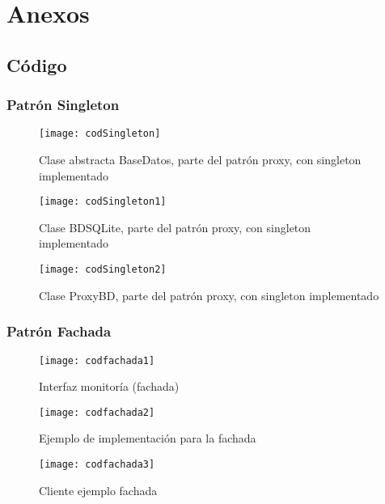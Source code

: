 \chapter{Anexos}
\section{Código}
\subsection{Patrón Singleton}

\begin{figure}[H]
	\centering
	\texttt{[image: codSingleton]}
	\centering
	\caption{Clase abstracta BaseDatos, parte del patrón proxy, con singleton implementado}
	\label{fig:codSingleton}
\end{figure}
\begin{figure}[H]
	\centering
	\texttt{[image: codSingleton1]}
	\centering
	\caption{Clase BDSQLite, parte del patrón proxy, con singleton implementado}
	\label{fig:codSingleton1}
\end{figure}
\begin{figure}[H]
	\centering
	\texttt{[image: codSingleton2]}
	\centering
	\caption{Clase ProxyBD, parte del patrón proxy, con singleton implementado}
	\label{fig:codSingleton2}
\end{figure}
\subsection{Patrón Fachada}
\begin{figure}[H]

	\texttt{[image: codfachada1]}
	\caption{Interfaz monitoría (fachada)}
	\label{fig:codfachada1}
\end{figure}
\clearpage
\begin{figure}[H]
	\centering
	\texttt{[image: codfachada2]}
	\centering
	\caption{Ejemplo de implementación para la fachada}
	\label{fig:codfachada2}
\end{figure}
\begin{figure}[H]
	\centering
	\texttt{[image: codfachada3]}
	\centering
	\caption{Cliente ejemplo fachada}
	\label{fig:codfachada3}
\end{figure}
